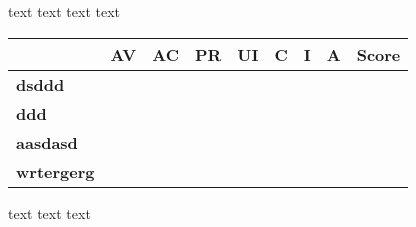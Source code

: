     \newpage
    text text text text
      \centering
        \begin{table}[H]
        \begin{tabular}{m{}|m{}|m{}|m{}|m{}|m{}|m{}|m{}|m{}}
        \textbf{}          & \textbf{AV} & \textbf{AC} & \textbf{PR} & \textbf{UI} & \textbf{C} & \textbf{I} & \textbf{A} & \textbf{Score} \\ \hline
        \textbf{dsddd}     &             &             &             &             &            &            &            &                \\ \hline
        \textbf{ddd}       &             &             &             &             &            &            &            &                \\ \hline
        \textbf{aasdasd}   &             &             &             &             &            &            &            &                \\ \hline
        \textbf{wrtergerg} &             &             &             &             &            &            &            &               
        \end{tabular}
        \end{table}
      \label{tab:test}
    text text text
    \newpage